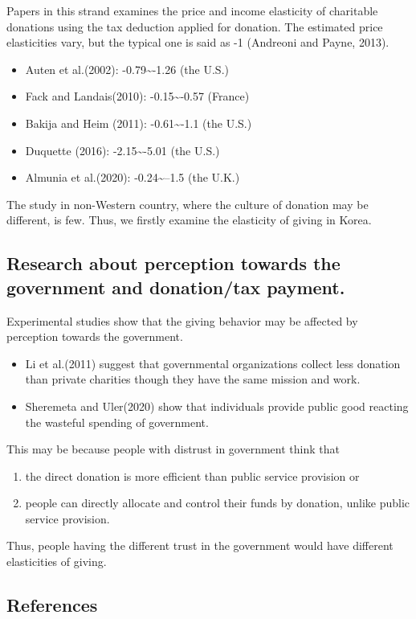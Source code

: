 \documentclass[ review  , 3p ]{elsarticle}
\providecommand{\tightlist}{%
  \setlength{\itemsep}{0pt}\setlength{\parskip}{0pt}}
\begin{document}
  Papers in this strand examines the price and income elasticity of charitable donations using the tax deduction applied for donation.
  The estimated price elasticities vary, but the typical one is said as -1 (Andreoni and Payne, 2013).
  
  \begin{itemize}
  \tightlist
  \item
    Auten et al.(2002): -0.79\textasciitilde-1.26 (the U.S.)
  \item
    Fack and Landais(2010): -0.15\textasciitilde-0.57 (France)
  \item
    Bakija and Heim (2011): -0.61\textasciitilde-1.1 (the U.S.)
  \item
    Duquette (2016): -2.15\textasciitilde-5.01 (the U.S.)
  \item
    Almunia et al.(2020): -0.24\textasciitilde--1.5 (the U.K.)
  \end{itemize}
  
  The study in non-Western country, where the culture of donation may be different, is few.
  Thus, we firstly examine the elasticity of giving in Korea.
  
  \hypertarget{research-about-perception-towards-the-government-and-donationtax-payment.}{%
  \subsection{Research about perception towards the government and donation/tax payment.}\label{research-about-perception-towards-the-government-and-donationtax-payment.}}
  
  Experimental studies show that the giving behavior may be affected by perception towards the government.
  
  \begin{itemize}
  \tightlist
  \item
    Li et al.(2011) suggest that governmental organizations collect less donation than private charities though they have the same mission and work.
  \item
    Sheremeta and Uler(2020) show that individuals provide public good reacting the wasteful spending of government.
  \end{itemize}
  
  This may be because people with distrust in government think that
  
  \begin{enumerate}
  \def\labelenumi{\arabic{enumi}.}
  \tightlist
  \item
    the direct donation is more efficient than public service provision or
  \item
    people can directly allocate and control their funds by donation, unlike public service provision.
  \end{enumerate}
  
  Thus, people having the different trust in the government would have different elasticities of giving.
  
  \clearpage
  
  \hypertarget{references}{%
  \subsection*{References}\label{references}}
\end{document}
